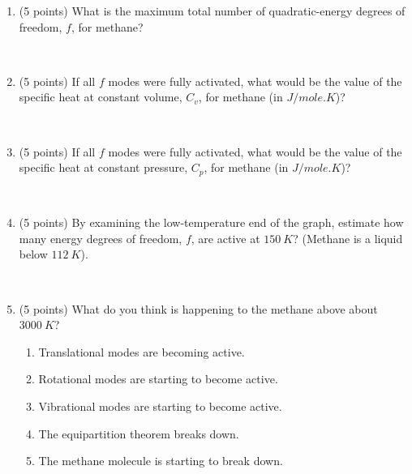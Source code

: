 \documentclass[fleqn]{article}
\begin{document}
\begin{enumerate}
\begin{enumerate}
        \textcolor{hwColor}{
          \\
        }

      \item (5 points) What is the maximum total number of quadratic-energy degrees of freedom, $f$,
      for methane?

        \textcolor{hwColor}{
          \\
        }

      \item (5 points) If all $f$ modes were fully activated, what would be the value of the specific heat
      at constant volume, $C_v$, for methane (in $J/mole.K$)?

        \textcolor{hwColor}{
          \\
        }

      \item (5 points) If all $f$ modes were fully activated, what would be the value of the specific heat
      at constant pressure, $C_p$, for methane (in $J/mole.K$)?

        \textcolor{hwColor}{
          \\
        }

      \item (5 points) By examining the low-temperature end of the graph, estimate how many energy
      degrees of freedom, $f$, are active at $150 ~ K$? (Methane is a liquid below $112 ~ K$).

        \textcolor{hwColor}{
          \\
        }

      \item (5 points) What do you think is happening to the methane above about $3000 ~ K$?
      \begin{enumerate}
        \item Translational modes are becoming active.

        \item Rotational modes are starting to become active.

        \item Vibrational modes are starting to become active.

        \item The equipartition theorem breaks down.

        \item The methane molecule is starting to break down.

      \end{enumerate}


\end{enumerate}
\end{enumerate}
\end{document}
